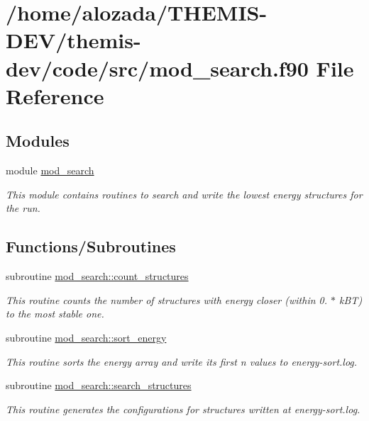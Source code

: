 \hypertarget{mod__search_8f90}{}\section{/home/alozada/\+T\+H\+E\+M\+I\+S-\/\+D\+E\+V/themis-\/dev/code/src/mod\+\_\+search.f90 File Reference}
\label{mod__search_8f90}
\subsection*{Modules}
\begin{DoxyCompactItemize}
\item 
module \hyperlink{namespacemod__search}{mod\+\_\+search}
\begin{DoxyCompactList}\small\item\em This module contains routines to search and write the lowest energy structures for the run. \end{DoxyCompactList}\end{DoxyCompactItemize}
\subsection*{Functions/\+Subroutines}
\begin{DoxyCompactItemize}
\item 
subroutine \hyperlink{namespacemod__search_a5026804a4e265b1a450eebc86cd81575}{mod\+\_\+search\+::count\+\_\+structures}
\begin{DoxyCompactList}\small\item\em This routine counts the number of structures with energy closer (within 0. $\ast$ k\+BT) to the most stable one. \end{DoxyCompactList}\item 
subroutine \hyperlink{namespacemod__search_a55e1f850472fe6cef190a6838ae61e51}{mod\+\_\+search\+::sort\+\_\+energy}
\begin{DoxyCompactList}\small\item\em This routine sorts the energy array and write its first n values to energy-\/sort.\+log. \end{DoxyCompactList}\item 
subroutine \hyperlink{namespacemod__search_ac11978e9ebdb6b101a09555f4742a4c9}{mod\+\_\+search\+::search\+\_\+structures}
\begin{DoxyCompactList}\small\item\em This routine generates the configurations for structures written at energy-\/sort.\+log. \end{DoxyCompactList}\end{DoxyCompactItemize}
